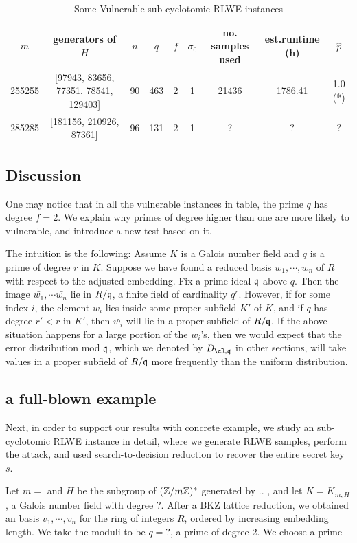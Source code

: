\documentclass{amsart}
\begin{document}
\begin{table}
\caption{Some Vulnerable sub-cyclotomic RLWE instances}
\begin{tabular}{c|c|c|c|c|c|c|c|c}
$m$ & generators of $H$ & $n$ & $q$ & $f$ & $\sigma_0$ & no. samples used & est.runtime (h) & $\hat{p}$ \\ \hline
255255 & [97943, 83656, 77351, 78541, 129403] & 90 & 463 & 2 & 1 & 21436 & 1786.41 & 1.0 (*) \\
285285 & [181156, 210926, 87361] & 96 & 131 & 2 & 1 & ? & ? & ?
\end{tabular}
\end{table}

\subsection{Discussion}
One may notice that in all the vulnerable instances in table, the prime $q$ has degree $f = 2$. We explain why primes of degree higher than one are more likely to vulnerable, and introduce a new test based on it.

The intuition is the following: Assume $K$ is a Galois number field and $q$ is a prime of degree $r$ in $K$. Suppose we have found a reduced basis $w_1,\cdots, w_n$ of $R$ with respect to the adjusted embedding. Fix a prime ideal $\mathfrak{q}$ above $q$. Then the image $\bar{w_1}, \cdots \bar{w_n}$ lie in $R/\mathfrak{q}$, a finite field of cardinality $q^r$. However, if for some index $i$, the element $w_i$ lies inside some proper subfield $K'$ of $K$, and if $q$ has degree $r' < r$ in $K'$, then  $\bar{w_i}$ will lie in a proper subfield of $R/\mathfrak{q}$. If the above situation happens for a large portion of the $w_i$'s, then we would expect that the error distribution mod $\mathfrak{q}$, which we denoted by $D_{\cR,\fq}$ in other sections, will take values in a proper subfield of $R/\mathfrak{q}$ more frequently than the uniform distribution.

\subsection{a full-blown example}
Next, in order to support our results with concrete example, we study an sub-cyclotomic RLWE instance in detail, where we generate RLWE samples, perform the attack, and used search-to-decision reduction to recover the entire secret key $s$.


Let $m = $ and $H$ be the subgroup of $(\mathbb{Z}/m\mathbb{Z})^*$ generated by .. , and let $K = K_{m,H}$, a Galois number field with degree ?. After a BKZ lattice reduction, we obtained an basis $v_1, \cdots, v_n$ for the ring of integers $R$, ordered by increasing embedding length. We take the moduli to be $q = ?$, a prime of degree 2. We choose a prime
\end{document}
